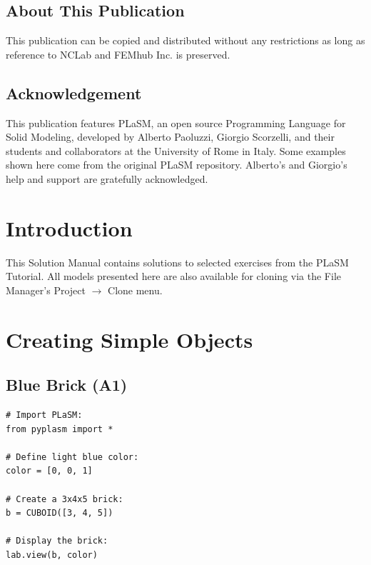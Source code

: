 \documentclass[article,A4,12pt]{llncs}
\begin{document}
\subsection*{About This Publication}
This publication can be copied and distributed without any restrictions
as long as reference to NCLab and FEMhub Inc. is preserved.

\subsection*{Acknowledgement}
This publication features PLaSM, an open source Programming Language for 
Solid Modeling, developed by Alberto Paoluzzi, Giorgio Scorzelli, and their 
students and collaborators at the University of Rome in Italy. Some examples 
shown here come from the original PLaSM repository. Alberto's 
and Giorgio's help and support are gratefully acknowledged. 

\normalsize

\newpage
\setcounter{tocdepth}{2}
\tableofcontents

\newpage

\pagestyle{plain}
\setcounter{page}{1}


\section{Introduction}

This Solution Manual contains solutions to selected exercises from the 
PLaSM Tutorial. All models presented here are also available for 
cloning via the File Manager's Project $\rightarrow$ Clone menu.

\section{Creating Simple Objects}

\subsection{Blue Brick (A1)}

\begin{verbatim}
# Import PLaSM:
from pyplasm import *

# Define light blue color:
color = [0, 0, 1]

# Create a 3x4x5 brick:
b = CUBOID([3, 4, 5])

# Display the brick:
lab.view(b, color)
\end{verbatim}
\end{document}
